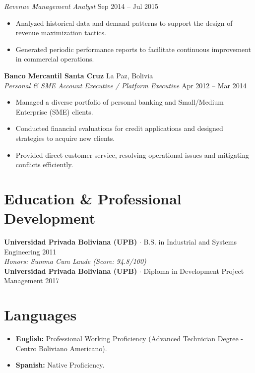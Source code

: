 \documentclass[11pt,a4paper,sans]{article}
\begin{document}
\vspace{2pt}
\textit{Revenue Management Analyst} \hfill Sep 2014 -- Jul 2015
\begin{itemize}
    \item Analyzed historical data and demand patterns to support the design of revenue maximization tactics.
    \item Generated periodic performance reports to facilitate continuous improvement in commercial operations.
\end{itemize}

\vspace{6pt}

\textbf{Banco Mercantil Santa Cruz} \hfill La Paz, Bolivia \\
\textit{Personal \& SME Account Executive / Platform Executive} \hfill Apr 2012 -- Mar 2014
\begin{itemize}
    \item Managed a diverse portfolio of personal banking and Small/Medium Enterprise (SME) clients.
    \item Conducted financial evaluations for credit applications and designed strategies to acquire new clients.
    \item Provided direct customer service, resolving operational issues and mitigating conflicts efficiently.
\end{itemize}

\section{Education \& Professional Development}
\textbf{Universidad Privada Boliviana (UPB)} $\cdot$ B.S. in Industrial and Systems Engineering \hfill 2011 \\
\textit{Honors: Summa Cum Laude (Score: 94.8/100)} \\
\textbf{Universidad Privada Boliviana (UPB)} $\cdot$ Diploma in Development Project Management \hfill 2017 

\section{Languages}
\begin{itemize}
    \item \textbf{English:} Professional Working Proficiency (Advanced Technician Degree - Centro Boliviano Americano).
    \item \textbf{Spanish:} Native Proficiency.
\end{itemize}
\end{document}
